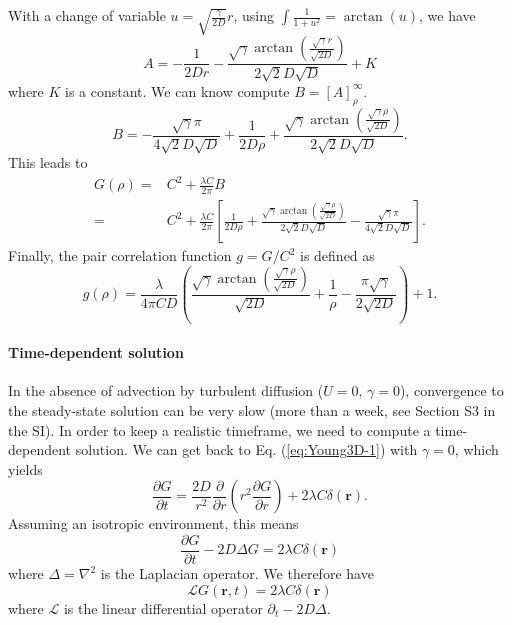 \documentclass[english]{article}
\begin{document}
With a change of variable $u=\sqrt{\frac{\gamma}{2D}}r$, using $\int\frac{1}{1+u^{2}}=\arctan(u)$,
we have
\begin{equation}
A=-\frac{1}{2Dr}-\frac{\sqrt{\gamma}\arctan\left(\frac{\sqrt{\gamma}r}{\sqrt{2D}}\right)}{2\sqrt{2}D\sqrt{D}}+K
\end{equation}
where $K$ is a constant. We can know compute $B=[A]_{\rho}^{\infty}.$
\begin{equation}
B=-\frac{\sqrt{\gamma}\pi}{4\sqrt{2}D\sqrt{D}}+\frac{1}{2D\rho}+\frac{\sqrt{\gamma}\arctan\left(\frac{\sqrt{\gamma}\rho}{\sqrt{2D}}\right)}{2\sqrt{2}D\sqrt{D}}.
\end{equation}
This leads to
\begin{align}
G(\rho) = & C^{2}+\frac{\lambda C}{2\pi}B\\
 = & C^{2}+\frac{\lambda C}{2\pi}\left[\frac{1}{2D\rho}+\frac{\sqrt{\gamma}\arctan\left(\frac{\sqrt{\gamma}\rho}{\sqrt{2D}}\right)}{2\sqrt{2}D\sqrt{D}}-\frac{\sqrt{\gamma}\pi}{4\sqrt{2}D\sqrt{D}}\right].
\end{align}
Finally, the pair correlation function $g=G/C^{2}$ is defined as
\begin{equation}
g(\rho)=\frac{\lambda}{4\pi CD}\left(\frac{\sqrt{\gamma}\arctan\left(\frac{\sqrt{\gamma}\rho}{\sqrt{2D}}\right)}{\sqrt{2D}}+\frac{1}{\rho}-\frac{\pi\sqrt{\gamma}}{2\sqrt{2D}}\right)+1.\label{eq:pcf_adv_bbm}
\end{equation}


\paragraph{Time-dependent solution}

In the absence of advection by turbulent diffusion ($U=0,\,\gamma=0$),
convergence to the steady-state solution can be very slow (more than
a week, see Section S3 in the SI). In order to keep a realistic timeframe,
we need to compute a time-dependent solution. We can get back to Eq.
(\ref{eq:Young3D-1}) with $\gamma=0$, which yields
\begin{equation}
\frac{\partial G}{\partial t}=\frac{2D}{r^{2}}\frac{\partial}{\partial r}\left(r^{2}\frac{\partial G}{\partial r}\right)+2\lambda C\delta(\boldsymbol{r}).\label{eq:G_no_adv}
\end{equation}
Assuming an isotropic environment, this means
\begin{equation}
\frac{\partial G}{\partial t}-2D\Delta G=2\lambda C\delta(\boldsymbol{r})
\end{equation}
where $\Delta=\nabla^{2}$ is the Laplacian operator. We therefore
have
\begin{equation}
\mathcal{L}G(\boldsymbol{r},t)=2\lambda C\delta(\boldsymbol{r})
\end{equation}
where $\mathcal{L}$ is the linear differential operator $\partial_{t}-2D\Delta$.
\end{document}
